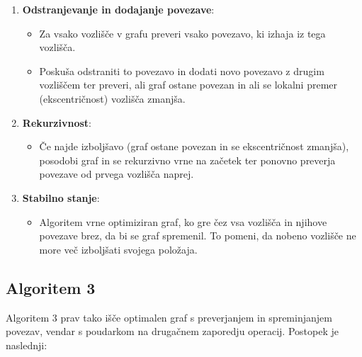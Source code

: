 \documentclass[fin1, tisk]{fmfdelo}
\begin{document}
\begin{enumerate}
    \item \textbf{Odstranjevanje in dodajanje povezave}:
    \begin{itemize}
        \item Za vsako vozlišče v grafu preveri vsako povezavo, ki izhaja iz tega vozlišča.
        \item Poskuša odstraniti to povezavo in dodati novo povezavo z drugim vozliščem ter preveri, ali graf ostane povezan in ali se lokalni premer (ekscentričnost) vozlišča zmanjša.
    \end{itemize}
    
    \item \textbf{Rekurzivnost}:
    \begin{itemize}
        \item Če najde izboljšavo (graf ostane povezan in se ekscentričnost zmanjša), posodobi graf in se rekurzivno vrne na začetek ter ponovno preverja povezave od prvega vozlišča naprej.
    \end{itemize}
    
    \item \textbf{Stabilno stanje}:
    \begin{itemize}
        \item Algoritem vrne optimiziran graf, ko gre čez vsa vozlišča in njihove povezave brez, da bi se graf spremenil. To pomeni, da nobeno vozlišče ne more več izboljšati svojega položaja.
    \end{itemize}
\end{enumerate}

\subsection*{Algoritem 3}

Algoritem $3$ prav tako išče optimalen graf s preverjanjem in spreminjanjem povezav, vendar s poudarkom na drugačnem zaporedju operacij. Postopek je naslednji:
\end{document}
